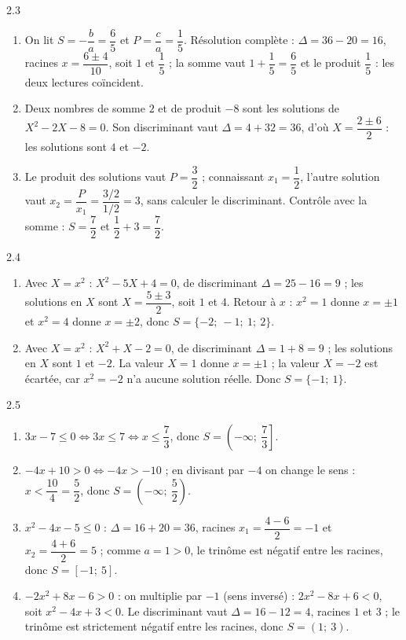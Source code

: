 \begin{corrige}{2.3}
\begin{enumerate}
\item On lit $S = -\dfrac{b}{a} = \dfrac{6}{5}$ et $P = \dfrac{c}{a} = \dfrac{1}{5}$. Résolution complète : $\Delta = 36 - 20 = 16$, racines $x = \dfrac{6 \pm 4}{10}$, soit $1$ et $\dfrac{1}{5}$ ; la somme vaut $1 + \dfrac{1}{5} = \dfrac{6}{5}$ et le produit $\dfrac{1}{5}$ : les deux lectures coïncident.
\item Deux nombres de somme $2$ et de produit $-8$ sont les solutions de $X^{2} - 2X - 8 = 0$. Son discriminant vaut $\Delta = 4 + 32 = 36$, d'où $X = \dfrac{2 \pm 6}{2}$ : les solutions sont $4$ et $-2$.
\item Le produit des solutions vaut $P = \dfrac{3}{2}$ ; connaissant $x_{1} = \dfrac{1}{2}$, l'autre solution vaut $x_{2} = \dfrac{P}{x_{1}} = \dfrac{3/2}{1/2} = 3$, sans calculer le discriminant. Contrôle avec la somme : $S = \dfrac{7}{2}$ et $\dfrac{1}{2} + 3 = \dfrac{7}{2}$.
\end{enumerate}
\end{corrige}

\begin{corrige}{2.4}
\begin{enumerate}
\item Avec $X = x^{2}$ : $X^{2} - 5X + 4 = 0$, de discriminant $\Delta = 25 - 16 = 9$ ; les solutions en $X$ sont $X = \dfrac{5 \pm 3}{2}$, soit $1$ et $4$. Retour à $x$ : $x^{2} = 1$ donne $x = \pm 1$ et $x^{2} = 4$ donne $x = \pm 2$, donc $S = \{-2;\ -1;\ 1;\ 2\}$.
\item Avec $X = x^{2}$ : $X^{2} + X - 2 = 0$, de discriminant $\Delta = 1 + 8 = 9$ ; les solutions en $X$ sont $1$ et $-2$. La valeur $X = 1$ donne $x = \pm 1$ ; la valeur $X = -2$ est écartée, car $x^{2} = -2$ n'a aucune solution réelle. Donc $S = \{-1;\ 1\}$.
\end{enumerate}
\end{corrige}

\begin{corrige}{2.5}
\begin{enumerate}
\item $3x - 7 \leqslant 0 \Longleftrightarrow 3x \leqslant 7 \Longleftrightarrow x \leqslant \dfrac{7}{3}$, donc $S = \left(-\infty;\ \dfrac{7}{3}\right]$.
\item $-4x + 10 > 0 \Longleftrightarrow -4x > -10$ ; en divisant par $-4$ on change le sens : $x < \dfrac{10}{4} = \dfrac{5}{2}$, donc $S = \left(-\infty;\ \dfrac{5}{2}\right)$.
\item $x^{2} - 4x - 5 \leqslant 0$ : $\Delta = 16 + 20 = 36$, racines $x_{1} = \dfrac{4 - 6}{2} = -1$ et $x_{2} = \dfrac{4 + 6}{2} = 5$ ; comme $a = 1 > 0$, le trinôme est négatif entre les racines, donc $S = [-1;\ 5]$.
\item $-2x^{2} + 8x - 6 > 0$ : on multiplie par $-1$ (sens inversé) : $2x^{2} - 8x + 6 < 0$, soit $x^{2} - 4x + 3 < 0$. Le discriminant vaut $\Delta = 16 - 12 = 4$, racines $1$ et $3$ ; le trinôme est strictement négatif entre les racines, donc $S = (1;\ 3)$.
\end{enumerate}
\end{corrige}
